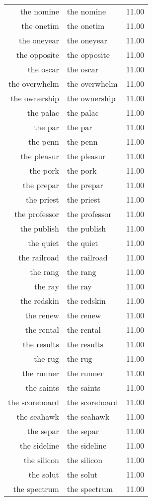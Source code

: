 \begin{table}[ht]
\begin{tabular}{rlr}
  the nomine & the nomine & 11.00 \\ 
  the onetim & the onetim & 11.00 \\ 
  the oneyear & the oneyear & 11.00 \\ 
  the opposite & the opposite & 11.00 \\ 
  the oscar & the oscar & 11.00 \\ 
  the overwhelm & the overwhelm & 11.00 \\ 
  the ownership & the ownership & 11.00 \\ 
  the palac & the palac & 11.00 \\ 
  the par & the par & 11.00 \\ 
  the penn & the penn & 11.00 \\ 
  the pleasur & the pleasur & 11.00 \\ 
  the pork & the pork & 11.00 \\ 
  the prepar & the prepar & 11.00 \\ 
  the priest & the priest & 11.00 \\ 
  the professor & the professor & 11.00 \\ 
  the publish & the publish & 11.00 \\ 
  the quiet & the quiet & 11.00 \\ 
  the railroad & the railroad & 11.00 \\ 
  the rang & the rang & 11.00 \\ 
  the ray & the ray & 11.00 \\ 
  the redskin & the redskin & 11.00 \\ 
  the renew & the renew & 11.00 \\ 
  the rental & the rental & 11.00 \\ 
  the results & the results & 11.00 \\ 
  the rug & the rug & 11.00 \\ 
  the runner & the runner & 11.00 \\ 
  the saints & the saints & 11.00 \\ 
  the scoreboard & the scoreboard & 11.00 \\ 
  the seahawk & the seahawk & 11.00 \\ 
  the separ & the separ & 11.00 \\ 
  the sideline & the sideline & 11.00 \\ 
  the silicon & the silicon & 11.00 \\ 
  the solut & the solut & 11.00 \\ 
  the spectrum & the spectrum & 11.00 \\ 

\end{tabular}
\end{table}
